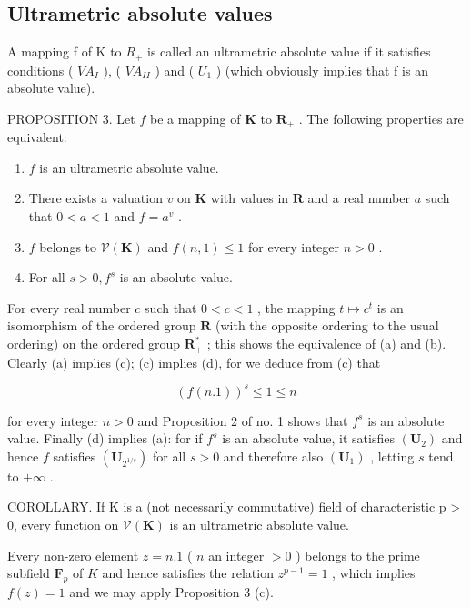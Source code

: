 \subsection{Ultrametric absolute values}

A mapping f of K to \(R_{+}\) is called an ultrametric absolute value if it satisfies conditions ( \(VA_{I}\) ), ( \(VA_{II}\) ) and ( \(U_{1}\) ) (which obviously implies that f is an absolute value).

PROPOSITION 3. Let \(f\) be a mapping of \(\mathbf{K}\) to \(\mathbf{R}_+\) . The following properties are equivalent:

\begin{enumerate}
\def\labelenumi{(\alph{enumi})}
\item
  \(f\) is an ultrametric absolute value.
\item
  There exists a valuation \(v\) on \(\mathbf{K}\) with values in \(\mathbf{R}\) and a real number \(a\) such that \(0 < a < 1\) and \(f = a^v\) .
\item
  \(f\) belongs to \(\mathcal{V}(\mathbf{K})\) and \(f(n,1) \leqslant 1\) for every integer \(n > 0\) .
\item
  For all \(s > 0, f^s\) is an absolute value.
\end{enumerate}

For every real number \(c\) such that \(0 < c < 1\) , the mapping \(t \mapsto c^t\) is an isomorphism of the ordered group \(\mathbf{R}\) (with the opposite ordering to the usual ordering) on the ordered group \(\mathbf{R}_+^*\) ; this shows the equivalence of (a) and (b). Clearly (a) implies (c); (c) implies (d), for we deduce from (c) that

\[
(f (n. 1)) ^ {s} \leqslant 1 \leqslant n
\]

for every integer \(n > 0\) and Proposition 2 of no. 1 shows that \(f^s\) is an absolute value. Finally (d) implies (a): for if \(f^s\) is an absolute value, it satisfies \((\mathbf{U}_2)\) and hence \(f\) satisfies \((\mathbf{U}_{2^{1 / s}})\) for all \(s > 0\) and therefore also \((\mathbf{U}_1)\) , letting \(s\) tend to \(+\infty\) .

COROLLARY. If K is a (not necessarily commutative) field of characteristic p > 0, every function on \(\mathcal{V}(\mathbf{K})\) is an ultrametric absolute value.

Every non-zero element \(z = n.1\) ( \(n\) an integer \(>0\) ) belongs to the prime subfield \(\mathbf{F}_p\) of \(K\) and hence satisfies the relation \(z^{p-1} = 1\) , which implies \(f(z) = 1\) and we may apply Proposition 3 (c).


